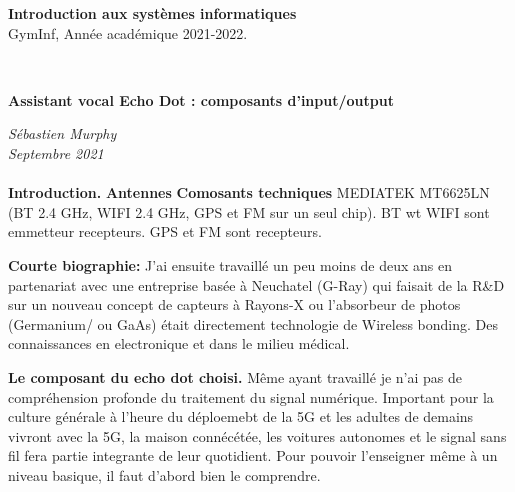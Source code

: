 \documentclass[12pt,svgnames]{article}
\begin{document}


\begin{large}\textcolor{airforceblue}{\textbf{Introduction aux systèmes informatiques} \\
GymInf,  Année académique 2021-2022.}
\end{large}\\
\begin{Large}
\begin{center}
   \textcolor{airforceblue}{\textbf{Assistant vocal Echo Dot : composants d'input/output}}\\[.1cm]
\end{center}
\end{Large}
\textit{Sébastien Murphy}\\
\textit{Septembre 2021}\\
\\[.4cm]


\textbf{Introduction.}
\textbf{Antennes}
\textbf{Comosants techniques}
MEDIATEK MT6625LN (BT 2.4 GHz, WIFI 2.4 GHz, GPS et FM sur un seul chip). BT wt WIFI sont emmetteur recepteurs. GPS et FM sont recepteurs.



\textbf{Courte biographie: }J'ai ensuite travaillé un peu moins de deux ans en partenariat avec une entreprise basée à Neuchatel (G-Ray) qui faisait de la R\&D sur un nouveau concept de capteurs à Rayons-X ou l'absorbeur de photos (Germanium/ ou GaAs) était directement technologie de Wireless bonding. Des connaissances en electronique et dans le milieu médical.

\textbf{Le composant du echo dot choisi.}
Même ayant travaillé je n'ai pas de compréhension profonde du traitement du signal numérique. Important pour la culture générale à l'heure du déploemebt de la 5G et les adultes de demains vivront avec la 5G, la maison connécétée, les voitures autonomes et le signal sans fil fera partie integrante de leur quotidient. Pour pouvoir l'enseigner même à un niveau basique, il faut d'abord bien le comprendre.
\end{document}

